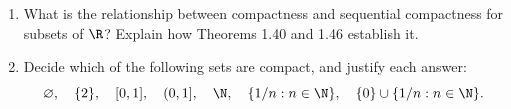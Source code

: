 \begin{enumerate}[resume]
  \item What is the relationship between compactness and sequential
    compactness for subsets of \(\R\)? Explain how Theorems 1.40 and 1.46
    establish it.

  \item Decide which of the following sets are compact, and justify
    each answer:
    \[
      \varnothing,\quad \{2\},\quad [0,1],\quad (0,1],\quad
      \N,\quad \{1/n:n\in\N\},\quad \{0\}\cup\{1/n:n\in\N\}.
    \]
\end{enumerate}
